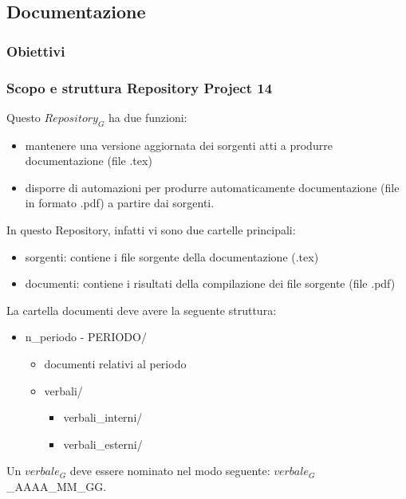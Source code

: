 \subsection{Documentazione}
\subsubsection{Obiettivi}

\subsubsection{Scopo e struttura Repository Project 14}
Questo $\textit{Repository}_G$ ha due funzioni:

\begin{itemize}
    \item mantenere una versione aggiornata dei sorgenti atti a produrre documentazione (file .tex)
    \item disporre di automazioni per produrre automaticamente documentazione (file in formato .pdf) a partire dai sorgenti.
\end{itemize}

In questo Repository, infatti vi sono due cartelle principali:
\begin{itemize}
    \item sorgenti: contiene i file sorgente della documentazione (.tex) 
    \item documenti: contiene i risultati della compilazione dei file sorgente (file .pdf)
\end{itemize}

La cartella documenti deve avere la seguente struttura:
\begin{itemize}
    \item n\_periodo - PERIODO/
    \begin{itemize}
        \item documenti relativi al periodo
        \item verbali/
        \begin{itemize}
            \item verbali\_interni/    
            \item verbali\_esterni/
        \end{itemize}
    \end{itemize}
\end{itemize}

Un $\textit{verbale}_G$ deve essere nominato nel modo seguente: $\textit{verbale}_G$\_AAAA\_MM\_GG.


